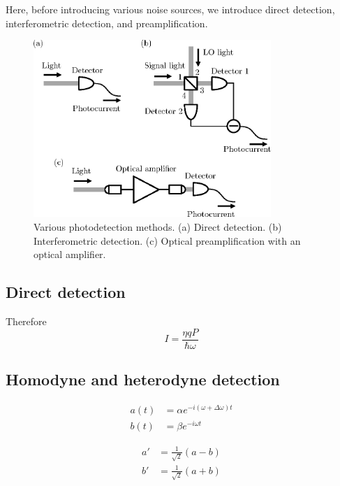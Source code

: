 \documentclass{book}
\begin{document}
Here, before introducing various noise sources, we introduce direct detection, interferometric detection, and preamplification.

\begin{figure}
  \centering
  \includegraphics[width=9cm]{fig/1-1_photodetection.eps}
  \caption{Various photodetection methods. (a) Direct detection. (b) Interferometric detection. (c) Optical preamplification with an optical amplifier.}
  \label{fig:photodetection}
\end{figure}


\subsection{Direct detection}
Therefore 
\begin{equation}
	I = \frac{\eta q P}{\hbar \omega}
	\nonumber
\end{equation}

\subsection{Homodyne and heterodyne detection}

\begin{equation}
\begin{aligned}
	a(t) &= \alpha e^{-i(\omega + \Delta \omega)t}\\
  	b(t) &= \beta e^{-i\omega t}
\end{aligned}\label{eq:complex_amplitude}
\end{equation}

\begin{equation}
\begin{aligned}
  a' &= \frac{1}{\sqrt 2}(a - b)\\
  b' &= \frac{1}{\sqrt 2}(a + b)
\end{aligned}\label{eq:BS_complex_amplitude}
\end{equation}
\end{document}
